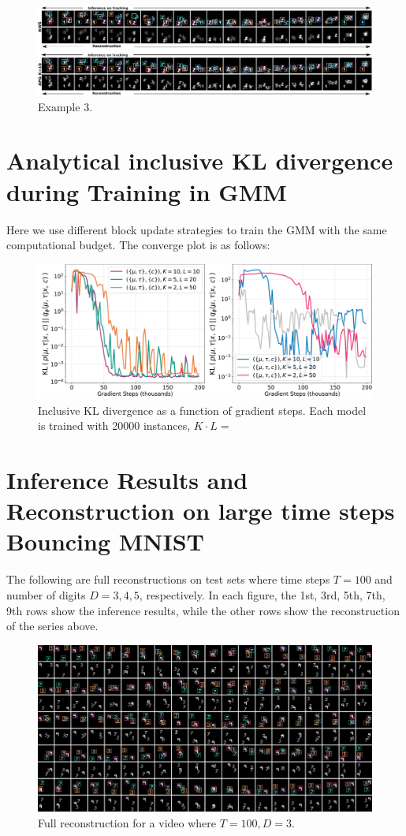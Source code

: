 \documentclass{article}
\theoremstyle{definition}
\begin{document}
\begin{figure}[h!]
\centering
\includegraphics[width=150mm]{figures/bmnist-5digits-samples-with-rws-4.pdf}
\caption{Example 3.}
\end{figure}
\newpage
\section{Analytical inclusive KL divergence during Training in GMM}
\label{appendix-kl-gmm-training}
Here we use different block update strategies to train the GMM with the same computational budget. The converge plot is as follows:
\begin{figure}[h!]
    \centering
    \includegraphics[width=170mm]{figures/kl_training_gmm.pdf}
    \caption{Inclusive KL divergence as a function of gradient steps. Each model is trained with 20000 instances, $K\cdot L=$}
    \label{fig:my_label}
\end{figure}

\newpage
\section{Inference Results and Reconstruction on large time steps Bouncing MNIST}
\label{appendix:full-recons}
The following are full reconstructions on test sets where time steps $T=100$ and number of digits $D=3, 4, 5$, respectively. In each figure, the 1st, 3rd, 5th, 7th, 9th rows show the inference results, while the other rows show the reconstruction of the series above.
\begin{figure}[h!]
\includegraphics[width=170mm]{figures/T=100-D=3.pdf}
\caption{Full reconstruction for a video where $T=100, D=3$.}
\end{figure}
\end{document}
